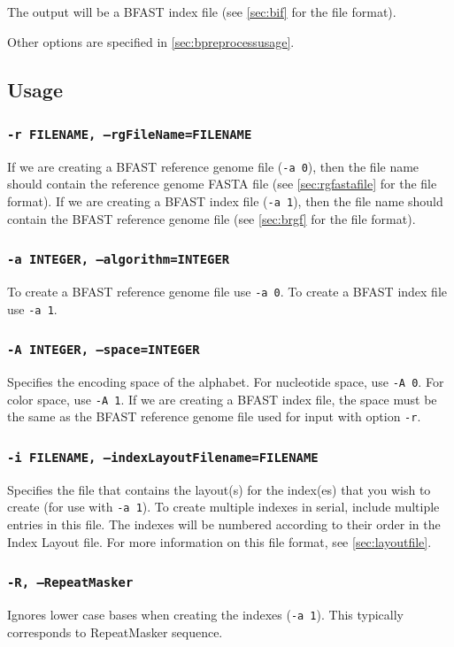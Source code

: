 \documentclass[a4paper,12pt]{book}
\newcommand{\TT}[1]{{\tt #1}} %
\newcommand{\rGFF}{reference genome FASTA file}
\newcommand{\BRGF}{BFAST reference genome file} %
\newcommand{\BIF}{BFAST index file} %
\begin{document}
The output will be a \BIF{} (see \autoref{sec:bif} for the file format).

Other options are specified in \autoref{sec:bpreprocessusage}.
\subsection{Usage}
\label{sec:bpreprocessusage}

\subsubsection{\TT{-r FILENAME, --rgFileName=FILENAME}}
If we are creating a \BRGF{} (\TT{-a 0}), then the file name should contain the \rGFF{} (see \autoref{sec:rgfastafile} for the file format).
If we are creating a \BIF{} (\TT{-a 1}), then the file name should contain the \BRGF{} (see \autoref{sec:brgf} for the file format).

\subsubsection{\TT{-a INTEGER, --algorithm=INTEGER}}
To create a \BRGF{} use \TT{-a 0}.
To create a \BIF{} use \TT{-a 1}.

\subsubsection{\TT{-A INTEGER, --space=INTEGER}}
Specifies the encoding space of the alphabet.
For nucleotide space, use \TT{-A 0}.
For color space, use \TT{-A 1}.
If we are creating a \BIF{}, the space must be the same as the \BRGF{} used for input with option \TT{-r}. 

\subsubsection{\TT{-i FILENAME, --indexLayoutFilename=FILENAME}}
Specifies the file that contains the layout(s) for the index(es) that you wish to create (for use with \TT{-a 1}).
To create multiple indexes in serial, include multiple entries in this file.
The indexes will be numbered according to their order in the Index Layout file.
For more information on this file format, see \autoref{sec:layoutfile}.

\subsubsection{\TT{-R, --RepeatMasker}}
Ignores lower case bases when creating the indexes (\TT{-a 1}).
This typically corresponds to RepeatMasker sequence.
\end{document}
